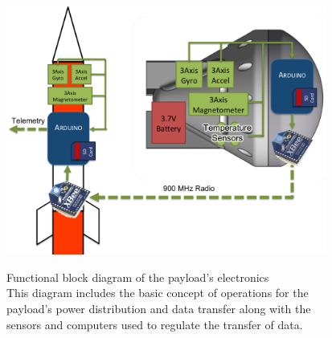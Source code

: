 \documentclass{article}
\begin{document}
\newpage
	\begin{figure}[H]
	\begin{center}
		\includegraphics[width=10.5cm]{FunctionalBlockDiagram}\\
	\end{center}
		\caption{}
		\label{FBD}
Functional block diagram of the payload's electronics\\ This diagram includes the basic concept of operations for the payload's power distribution and data transfer along with the sensors and computers used to regulate the transfer of data.
	\end{figure}
\end{document}
